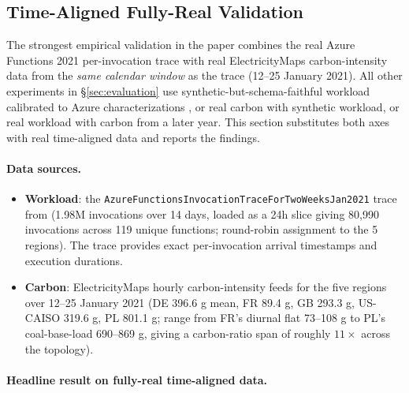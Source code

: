\subsection{Time-Aligned Fully-Real Validation}
\label{sec:evaluation:realboth}

The strongest empirical validation in the paper combines the real Azure
Functions 2021 per-invocation trace with real ElectricityMaps
carbon-intensity data from the \emph{same calendar window} as the
trace (12--25 January 2021). All other experiments in
\S\ref{sec:evaluation} use synthetic-but-schema-faithful workload
calibrated to Azure characterizations \citep{shahrad2020serverless,
zhang2021faster,azuretrace}, or real carbon with synthetic workload,
or real workload with carbon from a later year. This section
substitutes both axes with real time-aligned data and reports the
findings.

\paragraph{Data sources.}
\begin{itemize}
\item \textbf{Workload}: the
\texttt{AzureFunctionsInvocationTraceForTwoWeeksJan2021} trace from
\citet{zhang2021faster,azuretrace} (1.98M invocations over 14 days,
loaded as a 24h slice giving 80{,}990 invocations across 119 unique
functions; round-robin assignment to the 5 regions). The trace
provides exact per-invocation arrival timestamps and execution
durations.
\item \textbf{Carbon}: ElectricityMaps hourly carbon-intensity feeds
for the five regions over 12--25 January 2021 (DE 396.6 g mean, FR
89.4 g, GB 293.3 g, US-CAISO 319.6 g, PL 801.1 g; range from FR's
diurnal flat 73--108 g to PL's coal-base-load 690--869 g, giving a
carbon-ratio span of roughly $11\times$ across the topology).
\end{itemize}

\paragraph{Headline result on fully-real time-aligned data.}

